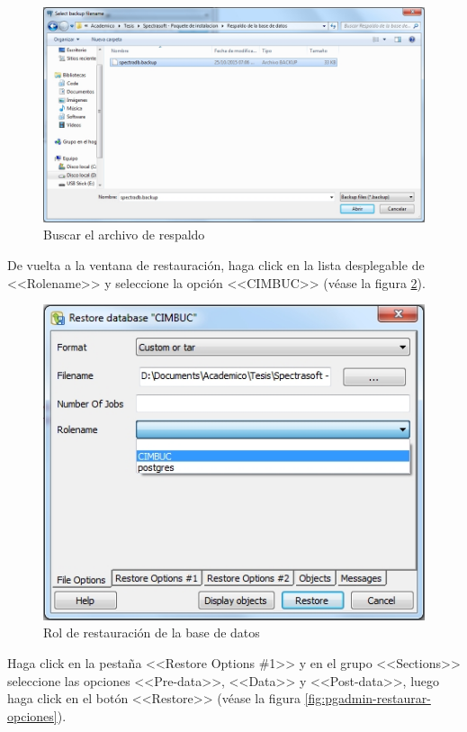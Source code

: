 \begin{figure}[H]
  \centering
  \includegraphics[width=1\linewidth]{./img/pgadmin-restaurar-buscar.jpg}
\caption[Buscar el archivo de respaldo]{Buscar el archivo de respaldo\label{fig:pgadmin-restaurar-buscar}}
\end{figure}

\newpage

De vuelta a la ventana de restauraci\'{o}n, haga click en la lista desplegable de <<Rolename>> y seleccione la opci\'{o}n <<CIMBUC>> (v\'{e}ase la figura \ref{fig:pgadmin-restaurar-rol}).

\begin{figure}[H]
  \centering
  \includegraphics[width=.6\linewidth]{./img/pgadmin-restaurar-rol.jpg}
\caption[Rol de restauraci\'{o}n de la base de datos]{Rol de restauraci\'{o}n de la base de datos\label{fig:pgadmin-restaurar-rol}}
\end{figure}

Haga click en la pesta\~{n}a <<Restore Options \#1>> y en el grupo <<Sections>> seleccione las opciones <<Pre-data>>, <<Data>> y <<Post-data>>, luego haga click en el bot\'{o}n <<Restore>> (v\'{e}ase la figura \ref{fig:pgadmin-restaurar-opciones}).

